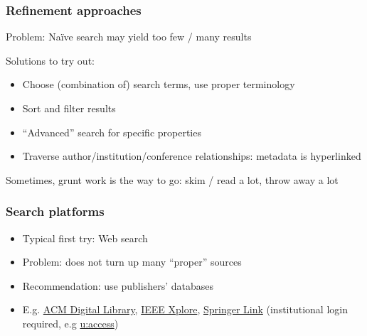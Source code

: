 \documentclass[]{beamer} %
\begin{document}
\begin{frame}
\frametitle{Refinement approaches}
Problem: Naïve search may yield too few / many results

Solutions to try out:
\begin{itemize}
	\item Choose (combination of) search terms, use proper terminology
	\item Sort and filter results
	\item ``Advanced'' search for specific properties
	\item Traverse author/institution/conference relationships: metadata is hyperlinked
\end{itemize}
Sometimes, grunt work is the way to go: skim / read a lot, throw away a lot
\end{frame}

\begin{frame}
\frametitle{Search platforms}
\small
\begin{itemize}
	\item Typical first try: Web search
	\item Problem: does not turn up many ``proper'' sources
	\item Recommendation: use publishers' databases
	\item E.g. \href{https://dl.acm.org/}{ACM Digital Library}, \href{https://ieeexplore.ieee.org/}{IEEE Xplore}, \href{https://link.springer.com/}{Springer Link} (institutional login required, e.g \href{https://uaccess.univie.ac.at/}{u:access})
\end{itemize}
\end{frame}
\end{document}
